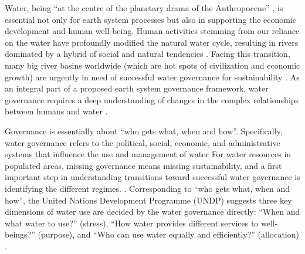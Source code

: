 \label{Intro.}
Water, being ``at the centre of the planetary drama of the Anthropocene'' \cite{gleesonIlluminatingwatercycle2020}, is essential not only for earth system processes but also in supporting the economic development and human well-being.
Human activities stemming from our reliance on the water have profoundly modified the natural water cycle, resulting in rivers dominated by a hybrid of social and natural tendencies
\cite{gleesonIlluminatingwatercycle2020,sivapalanSociohydrologynewscience2012,qinTheoreticalframeworkdualistic2014,abbottwatercycleAnthropocene2019,leviaHomogenizationterrestrialwater2020}.
Facing this transition, many big river basins worldwide (which are hot spots of civilization and economic growth) are urgently in need of successful water governance for sustainability
\cite{bestAnthropogenicstressesworld2019,falkenmarkUnderstandingwaterresilience2019,dibaldassarreSociohydrologyScientificChallenges2019}.
As an integral part of a proposed earth system governance framework, water governance requires a deep understanding of changes in the complex relationships between humans and water
\cite{dibaldassarreSociohydrologyScientificChallenges2019,biermannNavigatingAnthropoceneImproving2012,steffenemergenceevolutionEarth2020}.

Governance is essentially about ``who gets what, when and how''. Specifically, water governance refers to the political, social, economic, and administrative systems that influence the use and management of water %
For water resources in populated areas, missing governance means missing sustainability, and a first important step in understanding transitions toward successful water governance is identifying the different regimes.
\cite{undpwatergovernancefacilityWaterGovernanceIssue}.
Corresponding to ``who gets what, when and how'', the United Nations Development Programme (UNDP) suggests three key dimensions of water use are decided by the water governance directly: ``When and what water to use?'' (stress), ``How water provides different services to well-beings?'' (purpose), and ``Who can use water equally and efficiently?'' (allocation)
\cite{undpwatergovernancefacilityWaterGovernanceIssue, mariajacobsonUserguideassessing2013, kjellenWatergovernanceperspective2015}.

